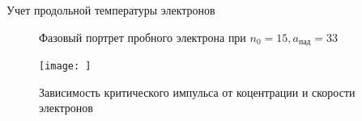\begin{frame}[t]{}
\begin{columns}[t]
\begin{column}{.48\linewidth}
\begin{block}{Учет продольной температуры электронов}
\begin{figure}[H]
                       
                           

                  
                   
                    \label{fig:spec}
            \caption{Фазовый портрет пробного электрона при $n_0=15, a_{\text{пад}}=33$}	
                \end{figure}

                \begin{figure}[H]
                    \begin{minipage}{0.6\linewidth}

                            \centering
                            \texttt{[image: ]}	
                    \end{minipage}

                    \label{fig:spec}
            \caption{Зависимость критического импульса от коцентрации и скорости электронов}	
                \end{figure}



\end{block}
\end{column}
\end{columns}
\end{frame}
